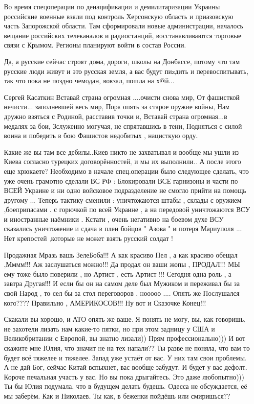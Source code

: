 Во время спецоперации по денацификации и демилитаризации Украины российские
военные взяли под контроль Херсонскую область и приазовскую часть Запорожской
области. Там сформировали новые администрации, началось вещание российских
телеканалов и радиостанций, восстанавливаются торговые связи с Крымом. Регионы
планируют войти в состав России.

Да, а русские сейчас строят дома, дороги, школы на Донбассе, потому что там
русские люди живут и это русская земля, а вас будут пиzдить и перевоспитывать,
так что пока не поздно чемодан, вокзал, пошла на х@й...

Сергей Касаткин
Вставай страна огромная ....очисти снова мир,
От фашисткой нечисти... заполневшей весь мир,
Пора опять за старое оружие войны,
Нам дружно взяться с Родиной, расставив точки и,
Вставай страна огромная...в медалях за бои,
Зслуженно могучая, не спрятавшись в тени,
Подняться с силой воина и победить в бою
Фашистов недобитых , нацисткую орду.

Какие же вы там все дебилы..Киев никто не захватывал и вообще мы ушли из Киева
согласно турецких договорённостей, и мы их выполнили.. А после этого еще
хрюкаете? Необходимо в начале спец.операции было следующее сделать, что уже
очень грамотно сделали ВС РФ : Блокировали ВСЕ гарнизоны и части по ВСЕЙ
Украине и ни одно войсковое подразделение не смогло прийти на помощь другому
... Теперь тактику сменили : уничтожаются штабы , склады с оружием
,боеприпасами . с горючкой по всей Украине , а на передовой уничтожаются ВСУ и
иностранные наёмники . Кстати , очень негативно на боевом духе ВСУ сказались
уничтожение и сдача в плен бойцов " Азова " и потеря Мариуполя ... Нет
крепостей ,которые не может взять русский солдат !

Продажная Мразь вашь ЗелеБоба!!! А как красиво Пел , а как красиво обещал ,Мммм!!! Аж заслушаться можно!!! Да продал он ваши жопы , ПРОДАЛ!!!
МЫ ему тоже было поверили , но Артист , есть Артист !!! Сегодня одна роль , а завтра Другая!!!
И если бы он на самом деле был Мужиком и переживал бы за свой Народ , то сел бы за стол переговоров , нооооо ....
Опять же Послушался кого????
Правильно , АМЕРИКОСОВ!!! Ну вот и Сказочке Конец!!!

Скакали вы хорошо, и АТО опять же ваше. Я понять не могу, вы, как говоришь, не
захотели лизать нам какие-то пятки, но при этом задницу у США и Великобритании
с Европой, вы знатно лизали)) Прям профессионально))) И вот скажите мне Юлия,
что значит не на тех напали?? Ты разве не поняла, что вам то будет всё тяжелее
и тяжелее. Запад уже устаёт от вас. У них там свои проблемы. А не дай Бог,
сейчас Китай вспыхнет, вас вообще забудут. И будет у вас дефолт. Короче
печальная участь у вас. Но вы пока дрыгайтесь. Это даже любопытно))) Ты бы Юлия
подумала, что в будущем делать будешь. Одесса не обсуждается, её мы заберём.
Как и Николаев. Ты как, в беженки пойдёшь или смиришься??

